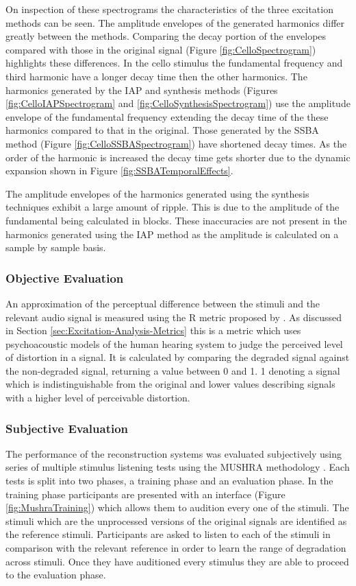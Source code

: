 			On inspection of these spectrograms the characteristics of the three excitation methods can be seen.
			The amplitude envelopes of the generated harmonics differ greatly between the methods. Comparing the
			decay portion of the envelopes compared with those in the original signal (Figure
			\ref{fig:CelloSpectrogram}) highlights these differences. In the cello stimulus the fundamental
			frequency and third harmonic have a longer decay time then the other harmonics. The harmonics
			generated by the IAP and synthesis methods (Figures \ref{fig:CelloIAPSpectrogram} and
			\ref{fig:CelloSynthesisSpectrogram}) use the amplitude envelope of the fundamental frequency
			extending the decay time of the these harmonics compared to that in the original. Those generated by
			the SSBA method (Figure \ref{fig:CelloSSBASpectrogram}) have shortened decay times. As the order of
			the harmonic is increased the decay time gets shorter due to the dynamic expansion shown in Figure
			\ref{fig:SSBATemporalEffects}.

			The amplitude envelopes of the harmonics generated using the synthesis techniques exhibit a large
			amount of ripple. This is due to the amplitude of the fundamental being calculated in blocks. These
			inaccuracies are not present in the harmonics generated using the IAP method as the amplitude is
			calculated on a sample by sample basis.

		\subsubsection*{Objective Evaluation}
			An approximation of the perceptual difference between the stimuli and the relevant audio signal is
			measured using the R metric proposed by \citet{tan2004predicting}. As discussed in
			Section \ref{sec:Excitation-Analysis-Metrics} this is a metric which uses psychoacoustic models of
			the human hearing system to judge the perceived level of distortion in a signal. It is calculated by
			comparing the degraded signal against the non-degraded signal, returning a value between 0 and 1. 1
			denoting a signal which is indistinguishable from the original and lower values describing signals
			with a higher level of perceivable distortion.

		\subsubsection*{Subjective Evaluation}
			The performance of the reconstruction systems was evaluated subjectively using series of multiple
			stimulus listening tests using the MUSHRA methodology \citep{mushra2014}. Each tests is split into
			two phases, a training phase and an evaluation phase. In the training phase participants are
			presented with an interface (Figure \ref{fig:MushraTraining}) which allows them to audition every
			one of the stimuli. The stimuli which are the unprocessed versions of the original signals are
			identified as the reference stimuli. Participants are asked to listen to each of the stimuli in
			comparison with the relevant reference in order to learn the range of degradation across stimuli.
			Once they have auditioned every stimulus they are able to proceed to the evaluation phase.


